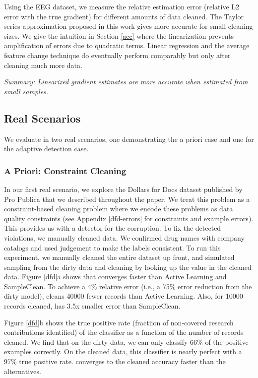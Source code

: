 Using the EEG dataset, we measure the relative estimation error (relative L2 error with the true gradient) for different amounts of data cleaned.
The Taylor series approximation proposed in this work gives more accurate for small cleaning sizes.
We give the intuition in Section \ref{acc} where the linearization prevents amplification of errors due to quadratic terms.
Linear regression and the average feature change technique do eventually perform comparably but only after cleaning much more data.

\vspace{0.25em}

\noindent \emph{Summary: Linearized gradient estimates are more accurate when estimated from small samples. }

\subsection{Real Scenarios}
We evaluate \sys in two real scenarios, one demonstrating the a priori case and one for the adaptive detection case.

\subsubsection{A Priori: Constraint Cleaning}\label{dfd-exp}
In our first real scenario, we explore the Dollars for Docs dataset published by Pro Publica that we described throughout the paper.
We treat this problem as a constraint-based cleaning problem where we encode these problems as data quality constraints (see Appendix \ref{dfd-errors} for constraints and example errors). 
This provides us with a detector for the corruption. 
To fix the detected violations, we manually cleaned data.
We confirmed drug names with company catalogs and used judgement to make the labels consistent.
To run this experiment, we manually cleaned the entire dataset up front, and simulated sampling from the dirty data and cleaning by looking up the value in the cleaned data.
Figure \ref{dfd}a shows that \sys converges faster than Active Learning and SampleClean.
To achieve a 4\% relative error (i.e., a 75\% error reduction from the dirty model), \sys cleans 40000 fewer records than Active Learning.
Also, for 10000 records cleaned, \sys has 3.5x smaller error than SampleClean.

Figure \ref{dfd}b shows the true positive rate (fractiion of non-covered research contributions identified) of the classifier as a function of the number of records cleaned. 
We find that on the dirty data, we can only classify 66\% of the positive examples correctly.
On the cleaned data, this classifier is nearly perfect with a 97\% true positive rate.
\sys converges to the cleaned accuracy faster than the alternatives.

